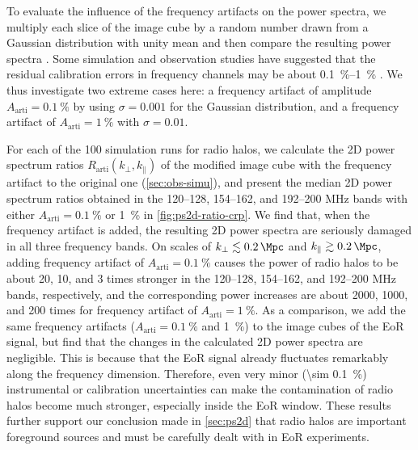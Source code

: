 \documentclass[modern]{aastex62}
\newcommand{\R}[1]{\mathrm{#1}}
\newcommand{\klos}{\text{$k_{\parallel}$}}
\newcommand{\kperp}{\text{$k_{\bot}$}}
\begin{document}
To evaluate the influence of the frequency artifacts on the power
spectra, we multiply each slice of the image cube by a random number
drawn from a Gaussian distribution with unity mean and then compare
the resulting power spectra \citep{chapman2016}.
Some simulation and observation studies have suggested that the residual
calibration errors in frequency channels may be about
\SIrange[range-units=repeat]{0.1}{1}{\percent}
\citep[e.g.,][]{barry2016,beardsley2016,ewallWice2017}.
We thus investigate two extreme cases here:
a frequency artifact of amplitude $A_{\R{arti}} = \SI{0.1}{\percent}$ by
using $\sigma = 0.001$ for the Gaussian distribution,
and a frequency artifact of $A_{\R{arti}} = \SI{1}{\percent}$ with
$\sigma = 0.01$.

For each of the 100 simulation runs for radio halos, we calculate the
2D power spectrum ratios $R_{\R{arti}}(\kperp, \klos)$ of the modified
image cube with the frequency artifact to the original one
(\autoref{sec:obs-simu}),
and present the median 2D power spectrum ratios obtained in the
\numrange{120}{128}, \numrange{154}{162}, and \numrange{192}{200}
\si{\MHz} bands with either $A_{\R{arti}} = \SI{0.1}{\percent}$ or
\SI{1}{\percent} in \autoref{fig:ps2d-ratio-crp}.
We find that, when the frequency artifact is added, the resulting 2D
power spectra are seriously damaged in all three frequency bands.
On scales of $\kperp \lesssim \SI{0.2}{\per\Mpc}$ and
$\klos \gtrsim \SI{0.2}{\per\Mpc}$, adding frequency artifact of
$A_{\R{arti}} = \SI{0.1}{\percent}$ causes the power of radio halos
to be about 20, 10, and 3 times stronger in the \numrange{120}{128},
\numrange{154}{162}, and \numrange{192}{200} \si{\MHz} bands,
respectively, and the corresponding power increases are about 2000,
1000, and 200 times for frequency artifact of
$A_{\R{arti}} = \SI{1}{\percent}$.
As a comparison, we add the same frequency artifacts
($A_{\R{arti}} = \SI{0.1}{\percent}$ and \SI{1}{\percent}) to the image
cubes of the EoR signal, but find that the changes in the calculated
2D power spectra are negligible.
This is because that the EoR signal already fluctuates remarkably along
the frequency dimension.
Therefore, even very minor (\SI{\sim 0.1}{\percent}) instrumental or
calibration uncertainties can make the contamination of radio halos
become much stronger, especially inside the EoR window.
These results further support our conclusion made in \autoref{sec:ps2d}
that radio halos are important foreground sources and must be carefully
dealt with in EoR experiments.

\end{document}
